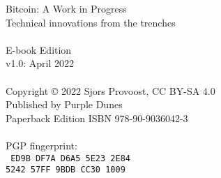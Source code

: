 \newpage
{\setlength{\parindent}{0cm}
\begin{vplace}
Bitcoin: A Work in Progress\\
Technical innovations from the trenches\\
\\
E-book Edition\\
v1.0: April 2022\\
\\
Copyright © 2022 Sjors Provoost, CC BY-SA 4.0\\
Published by Purple Dunes\\
Paperback Edition ISBN 978-90-9036042-3\\


\\

PGP fingerprint:\\
\texttt{
ED9B DF7A D6A5 5E23 2E84\\
5242 57FF 9BDB CC30 1009\\
}

\end{vplace}
}
